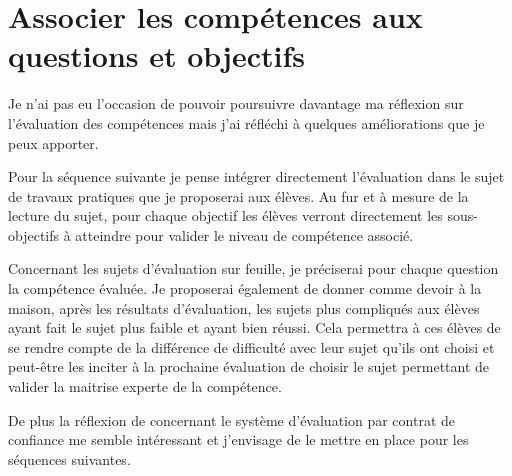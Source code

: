 \newpage
\section{Associer les compétences aux questions et objectifs}

Je n'ai pas eu l'occasion de pouvoir poursuivre davantage ma réflexion sur l'évaluation des compétences mais j'ai réfléchi à quelques améliorations que je peux apporter.

Pour la séquence suivante je pense intégrer directement l'évaluation dans le sujet de travaux pratiques que je proposerai aux élèves.
Au fur et à mesure de la lecture du sujet, pour chaque objectif les élèves verront directement les sous-objectifs à atteindre pour valider le niveau de compétence associé.

Concernant les sujets d'évaluation sur feuille, je préciserai pour chaque question la compétence évaluée.
Je proposerai également de donner comme devoir à la maison, après les résultats d'évaluation, les sujets plus compliqués aux élèves ayant fait le sujet plus faible et ayant bien réussi.
Cela permettra à ces élèves de se rendre compte de la différence de difficulté avec leur sujet qu'ils ont choisi et peut-être les inciter à la prochaine évaluation de choisir le sujet permettant de valider la maitrise experte de la compétence.

De plus la réflexion de \cite{antibi2007notes} concernant le système d'évaluation par contrat de confiance me semble intéressant et j'envisage de le mettre en place pour les séquences suivantes.



